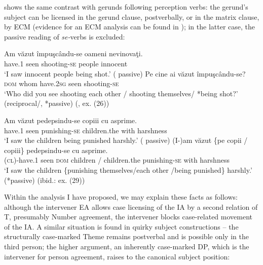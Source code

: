 \documentclass[output=paper]{langsci/langscibook}
\begin{document}
 shows the same contrast with gerunds following perception verbs: the gerund’s subject can be licensed in the gerund clause, postverbally, or in the matrix clause, by ECM (evidence for an ECM analysis can be found in \citealt{Avram2003}); in the latter case, the passive reading of \textit{se-}verbs is excluded:

\ea%
    \label{ex:giurgea:63}
    \ea
    \gll Am    văzut împuşcându-se oameni nevinovaţi. \\
          have.\textsc{1} seen   shooting-\textsc{se}      people  innocent\\
    \glt ‘I saw innocent people being shot.’ ( passive)
    \ex
    \gll Pe     cine      ai          văzut împuşcându-se? \\
         \textsc{dom} whom have.\textsc{2sg} seen  shooting-\textsc{se}\\
    \glt ‘Who did you see shooting each other / shooting themselves/ *being shot?’ (reciprocal\slash {}, *passive) (\citealt{Cornilescu1998}, ex. (26))
    \z
\z

\ea%
    \label{ex:giurgea:64}
\ea
    \gll Am     văzut pedepsindu-se copiii            cu     asprime.   \\
         have.\textsc{1} seen   punishing-\textsc{se}    children.the with harshness\\
    \glt ‘I saw the children being punished harshly.’ ( passive)
\ex
    \gll (I-)am       văzut \{pe     copii   / copiii\}         pedepsindu-se cu     asprime.   \\
          (\textsc{cl})-have.\textsc{1} seen \textsc{dom} children / children.the punishing-\textsc{se}   with harshness\\
    \glt ‘I saw the children \{punishing themselves\slash each other \slash *being punished\} harshly.’ (*passive) (ibid.: ex. (29))
    \z
\z    

Within the analysis I have proposed, we may explain these facts as follows: although the intervener EA allows case licensing of the IA by a second  relation of T, presumably Number agreement, the intervener blocks case-related movement of the IA. A similar situation is found in  quirky subject constructions – the structurally case-marked Theme remains postverbal and is possible only in the third\textsuperscript{} person; the higher argument, an inherently case-marked DP, which is the intervener for person agreement, raises to the canonical subject position:
\end{document}
